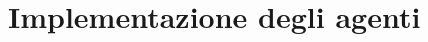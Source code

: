 \chapter*{Implementazione degli agenti}
\graphicspath{{Chapter5/Chapter5Figs/PNG/}{Chapter5/Chapter5Figs/PDF/}{Chapter5/Chapter5Figs/}}

